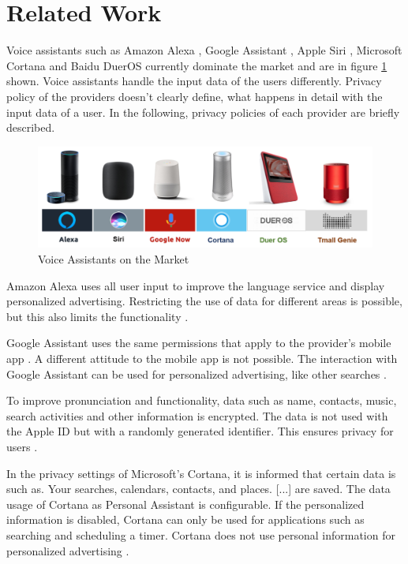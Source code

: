 \section{Related Work}
Voice assistants such as Amazon Alexa \cite{alexaAssitant}, Google Assistant \cite{googleAssistant}, Apple Siri \cite{siriAssistant}, Microsoft Cortana \cite{cortanaAssistant} and Baidu DuerOS \cite{baiduAssistant} currently dominate the market and are in figure \ref{fig:sprachassistenten} shown. Voice assistants handle the input data of the users differently. Privacy policy of the providers doesn't clearly define, what happens in detail with the input data of a user. In the following, privacy policies of each provider are briefly described.

\begin{figure}[h!]
	\centering
	\includegraphics[width=1\linewidth]{Picture/Sprachassistenten}
	\caption[Voice Assistants on the Market]{Voice Assistants on the Market}
	\label{fig:sprachassistenten}
\end{figure}

Amazon Alexa uses all user input to improve the language service and display personalized advertising. Restricting the use of data for different areas is possible, but this also limits the functionality \cite{alexaPrivacy}.

Google Assistant uses the same permissions that apply to the provider's mobile app \cite{googleShare}. A different attitude to the mobile app is not possible. The interaction with Google Assistant can be used for personalized advertising, like other searches \cite{googlePrivacy}.

To improve pronunciation and functionality, data such as name, contacts, music, search activities and other information is encrypted. The data is not used with the Apple ID but with a randomly generated identifier. This ensures privacy for users \cite{siriPrivacy}.

In the privacy settings of Microsoft's Cortana, it is informed that certain data is \glqq [...] such as. Your searches, calendars, contacts, and places. [...]\grqq{} are saved. The data usage of Cortana as Personal Assistant is configurable. If the personalized information is disabled, Cortana can only be used for applications such as searching and scheduling a timer. Cortana does not use personal information for personalized advertising \cite{cortanaAssistant}.

